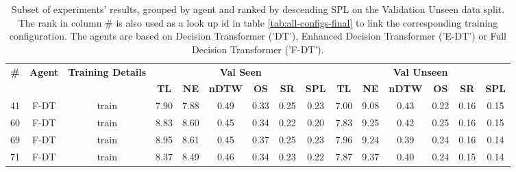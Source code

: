 \begin{table}
\centering
\caption{\label{tab:full_dt_ablation_dim}Subset of experiments' results, grouped by agent and ranked by descending SPL on the Validation Unseen data split. The rank in column \# is also used as a look up id in table \ref{tab:all-configs-final} to link the corresponding training configuration.     \newline The agents are based on Decision Transformer ('DT'), Enhanced Decision Transformer ('E-DT') or Full Decision Transformer ('F-DT').}
\begin{tabular}{@{\hskip3pt}c@{\hskip3pt}c@{\hskip3pt}c@{\hskip3pt}c@{\hskip3pt}c@{\hskip3pt}c@{\hskip3pt}c@{\hskip3pt}c@{\hskip3pt}c@{\hskip3pt}c@{\hskip3pt}c@{\hskip3pt}c@{\hskip3pt}c@{\hskip3pt}c@{\hskip3pt}c}
\toprule
\textbf{\#} & \textbf{Agent} & \textbf{Training Details} & \multicolumn{6}{c}{\textbf{Val Seen}} & \multicolumn{6}{c}{\textbf{Val Unseen}} \\
 \textbf{~} &     \textbf{~} &                \textbf{~} &       \textbf{TL} & \textbf{NE} & \textbf{nDTW} & \textbf{OS} & \textbf{SR} & \textbf{SPL} &         \textbf{TL} & \textbf{NE} & \textbf{nDTW} & \textbf{OS} & \textbf{SR} & \textbf{SPL} \\
\midrule
         41 &           F-DT &                     train &              7.90 &        7.88 &          0.49 &        0.33 &        0.25 &         0.23 &                7.00 &        9.08 &          0.43 &        0.22 &        0.16 &         0.15 \\
         60 &           F-DT &                     train &              8.83 &        8.60 &          0.45 &        0.34 &        0.22 &         0.20 &                7.83 &        9.25 &          0.42 &        0.25 &        0.16 &         0.15 \\
         69 &           F-DT &                     train &              8.95 &        8.61 &          0.45 &        0.37 &        0.25 &         0.23 &                7.96 &        9.24 &          0.39 &        0.24 &        0.16 &         0.14 \\
         71 &           F-DT &                     train &              8.37 &        8.49 &          0.46 &        0.34 &        0.23 &         0.22 &                7.87 &        9.37 &          0.40 &        0.24 &        0.15 &         0.14 \\
\bottomrule
\end{tabular}
\end{table}
